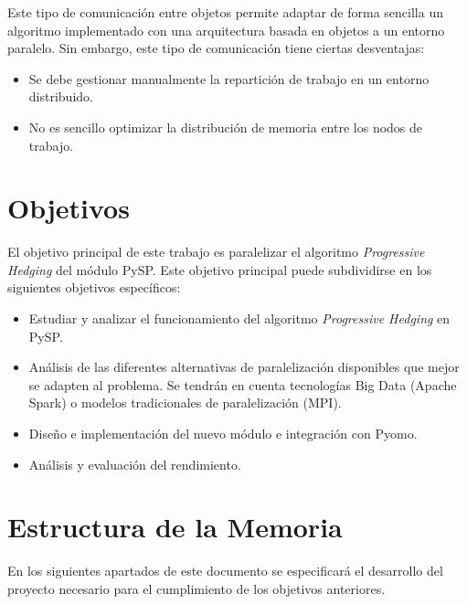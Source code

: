 Este tipo de comunicación entre objetos permite adaptar de forma sencilla un algoritmo implementado con una arquitectura basada en objetos a un entorno paralelo. Sin embargo, este tipo de comunicación tiene ciertas desventajas:

\begin{itemize}
    \item Se debe gestionar manualmente la repartición de trabajo en un entorno distribuido.
    \item No es sencillo optimizar la distribución de memoria entre los nodos de trabajo.
\end{itemize}

\section{Objetivos}


El objetivo principal de este trabajo es paralelizar el algoritmo \textit{Progressive Hedging} del módulo PySP. Este objetivo principal puede subdividirse en los siguientes objetivos específicos:

\begin{itemize}
    \item Estudiar y analizar el funcionamiento del algoritmo \textit{Progressive Hedging} en PySP.
    \item Análisis de las diferentes alternativas de paralelización disponibles que mejor se adapten al problema. Se tendrán en cuenta tecnologías Big Data (Apache Spark) o modelos tradicionales de paralelización (MPI).
    \item Diseño e implementación del nuevo módulo e integración con Pyomo.
    \item Análisis y evaluación del rendimiento.
\end{itemize}

\section{Estructura de la Memoria}


En los siguientes apartados de este documento se especificará el desarrollo del proyecto necesario para el cumplimiento de los objetivos anteriores.

